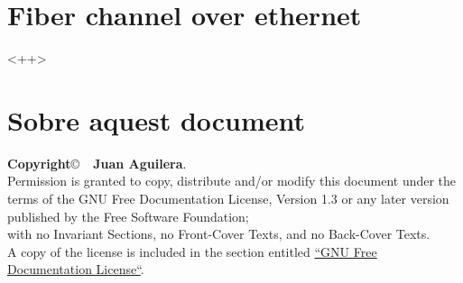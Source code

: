 \documentclass[a4paper]{article}
\begin{document}
\section{Fiber channel over ethernet}<++>


\section{Sobre aquest document}
\textbf{Copyright}\copyright\ \textbf{\the\year\ Juan Aguilera}.\\
Permission is granted to copy, distribute and/or modify this document under the terms of the GNU Free Documentation License, Version 1.3 or any later version published by the Free Software Foundation;\\
with no Invariant Sections, no Front-Cover Texts, and no Back-Cover Texts.\\
A copy of the license is included in the section entitled \href{http://www.gnu.org/licenses/fdl.html}{``GNU Free Documentation License``}.

\begin{thebibliography}{99}
	\bibitem{<++>} 
\end{thebibliography}
\end{document}
